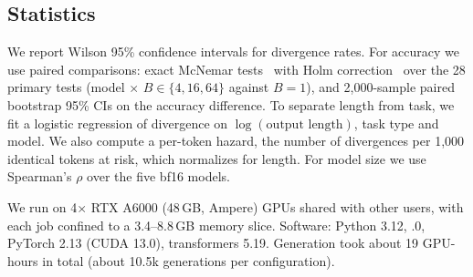 \subsection{Statistics}
We report Wilson 95\% confidence intervals for divergence rates. For accuracy we use paired comparisons: exact McNemar tests~\citep{mcnemar1947} with Holm correction~\citep{holm1979} over the 28 primary tests (model $\times$ $B\in\{4,16,64\}$ against $B=1$), and 2,000-sample paired bootstrap 95\% CIs on the accuracy difference. To separate length from task, we fit a logistic regression of divergence on $\log(\text{output length})$, task type and model. We also compute a per-token hazard, the number of divergences per 1,000 identical tokens at risk, which normalizes for length. For model size we use Spearman's $\rho$ over the five bf16 models.

 We run on 4$\times$ RTX A6000 (48\,GB, Ampere) GPUs shared with other users, with each job confined to a 3.4--8.8\,GB memory slice. Software: Python 3.12, .0, PyTorch 2.13 (CUDA 13.0), transformers 5.19. Generation took about 19 GPU-hours in total (about 10.5k generations per configuration).
